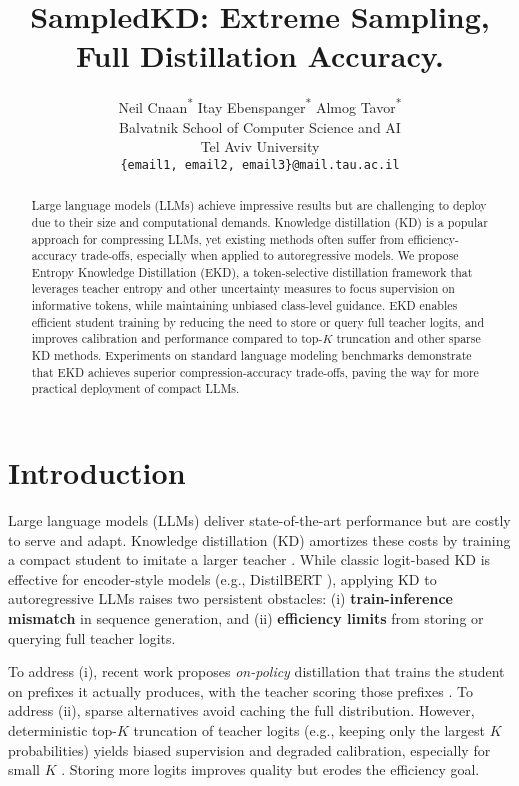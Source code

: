 \documentclass[11pt]{article}
\title{SampledKD: Extreme Sampling, Full Distillation Accuracy.}
\author{
  Neil Cnaan\textsuperscript{*} \qquad Itay Ebenspanger\textsuperscript{*} \qquad Almog Tavor\textsuperscript{*} \\
  Balvatnik School of Computer Science and AI \\
  Tel Aviv University \\
  \texttt{\{email1, email2, email3\}@mail.tau.ac.il} \\
}
\begin{document}
\maketitle
\let\thefootnote\relax
\footnotemark
{}
\begin{abstract}
	Large language models (LLMs) achieve impressive results but are challenging to deploy due to their size and computational demands. Knowledge distillation (KD) is a popular approach for compressing LLMs, yet existing methods often suffer from efficiency-accuracy trade-offs, especially when applied to autoregressive models. We propose Entropy Knowledge Distillation (EKD), a token-selective distillation framework that leverages teacher entropy and other uncertainty measures to focus supervision on informative tokens, while maintaining unbiased class-level guidance. EKD enables efficient student training by reducing the need to store or query full teacher logits, and improves calibration and performance compared to top-$K$ truncation and other sparse KD methods. Experiments on standard language modeling benchmarks demonstrate that EKD achieves superior compression-accuracy trade-offs, paving the way for more practical deployment of compact LLMs.
\end{abstract}

\section{Introduction}

Large language models (LLMs) deliver state-of-the-art performance but are costly to serve and adapt. Knowledge distillation (KD) amortizes these costs by training a compact student to imitate a larger teacher \citep{hinton2015distillation}. While classic logit-based KD is effective for encoder-style models (e.g., DistilBERT \citep{sanh2019distilbert}), applying KD to autoregressive LLMs raises two persistent obstacles: (i) \textbf{train-inference mismatch} in sequence generation, and (ii) \textbf{efficiency limits} from storing or querying full teacher logits.

To address (i), recent work proposes \emph{on-policy} distillation that trains the student on prefixes it actually produces, with the teacher scoring those prefixes \citep{agarwal2024gkd}. To address (ii), sparse alternatives avoid caching the full distribution. However, deterministic top-$K$ truncation of teacher logits (e.g., keeping only the largest $K$ probabilities) yields biased supervision and degraded calibration, especially for small $K$ \citep{anshumann2025sparse,shum2024first}. Storing more logits improves quality but erodes the efficiency goal.
\end{document}
